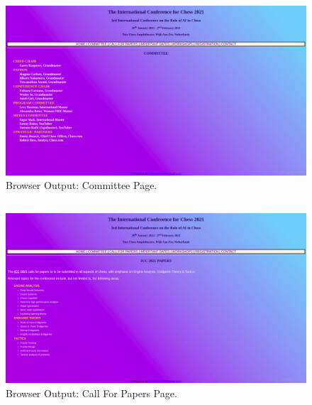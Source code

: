 \documentclass[12pt, a4]{article}
\begin{document}
\newpage
\subsection*{}
\begin{figure}[h]
\centering
\caption{Browser Output: Committee Page.}
\includegraphics[scale= 0.25]{Output/Committee.png}
\end{figure}

\newpage
\subsection*{}
\begin{figure}[h]
\centering
\caption{Browser Output: Call For Papers Page.}
\includegraphics[scale= 0.25]{Output/Papers.png}
\end{figure}

\newpage
\end{document}
